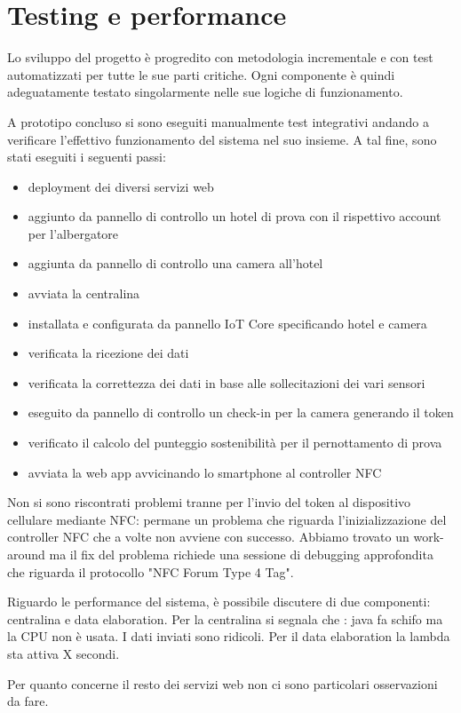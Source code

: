 

\section{Testing e performance}

Lo sviluppo del progetto è progredito con metodologia incrementale e con test automatizzati per tutte le sue parti critiche. 
Ogni componente è quindi adeguatamente testato singolarmente nelle sue logiche di funzionamento.

A prototipo concluso si sono eseguiti manualmente test integrativi andando a verificare l'effettivo funzionamento del sistema nel suo insieme.
A tal fine, sono stati eseguiti i seguenti passi:
\begin{itemize}
    \item deployment dei diversi servizi web
    \item aggiunto da pannello di controllo un hotel di prova con il rispettivo account per l'albergatore
    \item aggiunta da pannello di controllo una camera all'hotel
    \item avviata la centralina
    \item installata e configurata da pannello IoT Core specificando hotel e camera
    \item verificata la ricezione dei dati 
    \item verificata la correttezza dei dati in base alle sollecitazioni dei vari sensori
    \item eseguito da pannello di controllo un check-in per la camera generando il token
    \item verificato il calcolo del punteggio sostenibilità per il pernottamento di prova
    \item avviata la web app avvicinando lo smartphone al controller NFC
\end{itemize}

Non si sono riscontrati problemi tranne per l'invio del token al dispositivo cellulare mediante NFC: 
permane un problema che riguarda l'inizializzazione del controller NFC che a volte non avviene con successo. 
Abbiamo trovato un work-around ma il fix del problema richiede una sessione di debugging approfondita che riguarda il protocollo "NFC Forum Type 4 Tag".

Riguardo le performance del sistema, è possibile discutere di due componenti: centralina e data elaboration.
Per la centralina si segnala che : java fa schifo ma la CPU non è usata. I dati inviati sono ridicoli.
Per il data elaboration la lambda sta attiva X secondi.


Per quanto concerne il resto dei servizi web non ci sono particolari osservazioni da fare.

\newpage